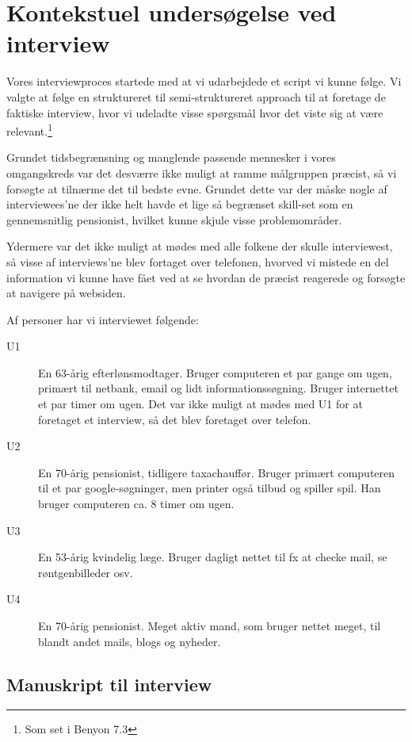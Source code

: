 \section{Kontekstuel undersøgelse ved interview}

Vores interviewproces startede med at vi udarbejdede et script vi kunne følge. Vi valgte at følge en struktureret til semi-struktureret approach til at foretage de faktiske interview, hvor vi udeladte visse spørgsmål hvor det viste sig at være relevant.\footnote{Som set i Benyon 7.3}

Grundet tidsbegrænsning og manglende passende mennesker i vores omgangskreds var det desværre ikke muligt at ramme målgruppen præcist, så vi forsøgte at tilnærme det til bedste evne. Grundet dette var der måske nogle af interviewees'ne der ikke helt havde et lige så begrænset skill-set som en gennemsnitlig pensionist, hvilket kunne skjule visse problemområder.

Ydermere var det ikke muligt at mødes med alle folkene der skulle interviewest, så visse af interviews'ne blev fortaget over telefonen, hvorved vi mistede en del information vi kunne have fået ved at se hvordan de præcist reagerede og forsøgte at navigere på websiden.

Af personer har vi interviewet følgende:

\begin{description}
    \item[U1] {
        En 63-årig efterlønsmodtager. Bruger computeren et par gange om ugen, primært til netbank, email og lidt informationssøgning. Bruger internettet et par timer om ugen. Det var ikke muligt at mødes med U1 for at foretaget et interview, så det blev foretaget over telefon.
    }
    \item[U2] {
        En 70-årig pensionist, tidligere taxachauffør. Bruger primært computeren til et par google-søgninger, men printer også tilbud og spiller spil. Han bruger computeren ca. 8 timer om ugen.
    }
    \item[U3] {
    En 53-årig kvindelig læge. Bruger dagligt nettet til fx at checke mail, se røntgenbilleder osv.
    }
    \item[U4] {
    En 70-årig pensionist. Meget aktiv mand, som bruger nettet meget, til blandt andet mails, blogs og nyheder.
    }
\end{description}

\subsection{Manuskript til interview}

